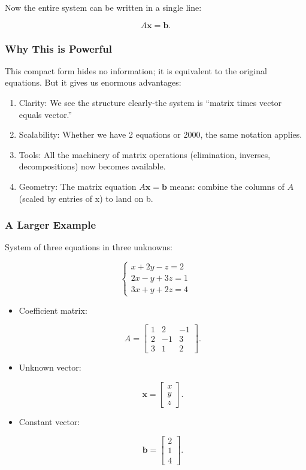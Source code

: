 \documentclass[
  letterpaper,
  DIV=11,
  numbers=noendperiod]{scrreprt}
\providecommand{\tightlist}{%
  \setlength{\itemsep}{0pt}\setlength{\parskip}{0pt}}
\begin{document}
Now the entire system can be written in a single line:

\[
A\mathbf{x} = \mathbf{b}.
\]

\subsubsection{Why This is Powerful}\label{why-this-is-powerful}

This compact form hides no information; it is equivalent to the original
equations. But it gives us enormous advantages:

\begin{enumerate}
\def\labelenumi{\arabic{enumi}.}
\tightlist
\item
  Clarity: We see the structure clearly-the system is ``matrix times
  vector equals vector.''
\item
  Scalability: Whether we have 2 equations or 2000, the same notation
  applies.
\item
  Tools: All the machinery of matrix operations (elimination, inverses,
  decompositions) now becomes available.
\item
  Geometry: The matrix equation \(A\mathbf{x} = \mathbf{b}\) means:
  combine the columns of \(A\) (scaled by entries of x) to land on b.
\end{enumerate}

\subsubsection{A Larger Example}\label{a-larger-example}

System of three equations in three unknowns:

\[
\begin{cases}  
x + 2y - z = 2 \\  
2x - y + 3z = 1 \\  
3x + y + 2z = 4  
\end{cases}
\]

\begin{itemize}
\item
  Coefficient matrix:

  \[
  A = \begin{bmatrix}  
  1 & 2 & -1 \\  
  2 & -1 & 3 \\  
  3 & 1 & 2  
  \end{bmatrix}.
  \]
\item
  Unknown vector:

  \[
  \mathbf{x} = \begin{bmatrix} x \\ y \\ z \end{bmatrix}.
  \]
\item
  Constant vector:

  \[
  \mathbf{b} = \begin{bmatrix} 2 \\ 1 \\ 4 \end{bmatrix}.
  \]
\end{itemize}
\end{document}
